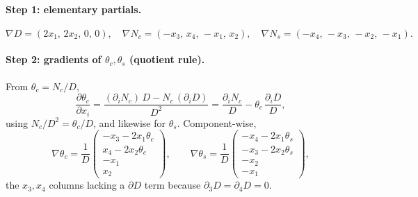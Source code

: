 \documentclass[11pt]{article}
\newcommand{\grad}{\nabla}
\begin{document}
\paragraph{Step 1: elementary partials.}
\begin{equation}
  \grad D=(2x_1,\,2x_2,\,0,\,0),\quad
  \grad N_c=(-x_3,\,x_4,\,-x_1,\,x_2),\quad
  \grad N_s=(-x_4,\,-x_3,\,-x_2,\,-x_1).
\end{equation}

\paragraph{Step 2: gradients of $\theta_c,\theta_s$ (quotient rule).}
From $\theta_c=N_c/D$,
\begin{equation}
  \frac{\partial\theta_c}{\partial x_i}
    = \frac{(\partial_i N_c)\,D-N_c\,(\partial_i D)}{D^2}
    = \frac{\partial_i N_c}{D}-\theta_c\,\frac{\partial_i D}{D},
\end{equation}
using $N_c/D^2=\theta_c/D$, and likewise for $\theta_s$. Component-wise,
\begin{equation}
  \grad\theta_c=\frac1D\!\begin{pmatrix}-x_3-2x_1\theta_c\\ x_4-2x_2\theta_c\\ -x_1\\ x_2\end{pmatrix}\!,
  \qquad
  \grad\theta_s=\frac1D\!\begin{pmatrix}-x_4-2x_1\theta_s\\ -x_3-2x_2\theta_s\\ -x_2\\ -x_1\end{pmatrix}\!,
\end{equation}
the $x_3,x_4$ columns lacking a $\partial D$ term because $\partial_{3}D=\partial_{4}D=0$.
\end{document}
